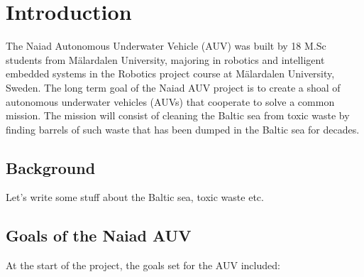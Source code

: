 
\section{Introduction}\label{sec:introduction}
The Naiad Autonomous Underwater Vehicle (AUV) was built by 18 M.Sc students from M\"{a}lardalen University, majoring in robotics and intelligent embedded systems in the Robotics project course at  M\"{a}lardalen University, Sweden. \newline
The long term goal of the Naiad AUV project is to create a shoal of autonomous underwater vehicles (AUVs) that cooperate to solve a common mission. The mission will consist of cleaning the Baltic sea from toxic waste by finding barrels of such waste that has been dumped in the Baltic sea for decades. 

\subsection{Background}
Let's write some stuff about the Baltic sea, toxic waste etc.

\subsection{Goals of the Naiad AUV}
At the start of the project, the goals set for the AUV included: %

